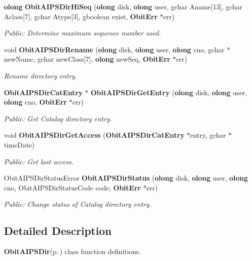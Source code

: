\begin{CompactItemize}
{\bf olong} {\bf Obit\-AIPSDir\-Hi\-Seq} ({\bf olong} disk, {\bf olong} user, gchar Aname[13], gchar Aclass[7], gchar Atype[3], gboolean exist, {\bf Obit\-Err} $\ast$err)
\begin{CompactList}\small\item\em Public: Determine maximum sequence number used. \item\end{CompactList}\item 
void {\bf Obit\-AIPSDir\-Rename} ({\bf olong} disk, {\bf olong} user, {\bf olong} cno, gchar $\ast$new\-Name, gchar new\-Class[7], {\bf olong} new\-Seq, {\bf Obit\-Err} $\ast$err)
\begin{CompactList}\small\item\em Rename directory entry. \item\end{CompactList}\item 
{\bf Obit\-AIPSDir\-Cat\-Entry} $\ast$ {\bf Obit\-AIPSDir\-Get\-Entry} ({\bf olong} disk, {\bf olong} user, {\bf olong} cno, {\bf Obit\-Err} $\ast$err)
\begin{CompactList}\small\item\em Public: Get Catalog directory entry. \item\end{CompactList}\item 
void {\bf Obit\-AIPSDir\-Get\-Access} ({\bf Obit\-AIPSDir\-Cat\-Entry} $\ast$entry, gchar $\ast$time\-Date)
\begin{CompactList}\small\item\em Public: Get last access. \item\end{CompactList}\item 
Obit\-AIPSDir\-Status\-Error {\bf Obit\-AIPSDir\-Status} ({\bf olong} disk, {\bf olong} user, {\bf olong} cno, Obit\-AIPSDir\-Status\-Code code, {\bf Obit\-Err} $\ast$err)
\begin{CompactList}\small\item\em Public: Change status of Catalog directory entry. \item\end{CompactList}\end{CompactItemize}


\subsection{Detailed Description}
{\bf Obit\-AIPSDir}{\rm (p.\,\pageref{structObitAIPSDir})} class function definitions. 



